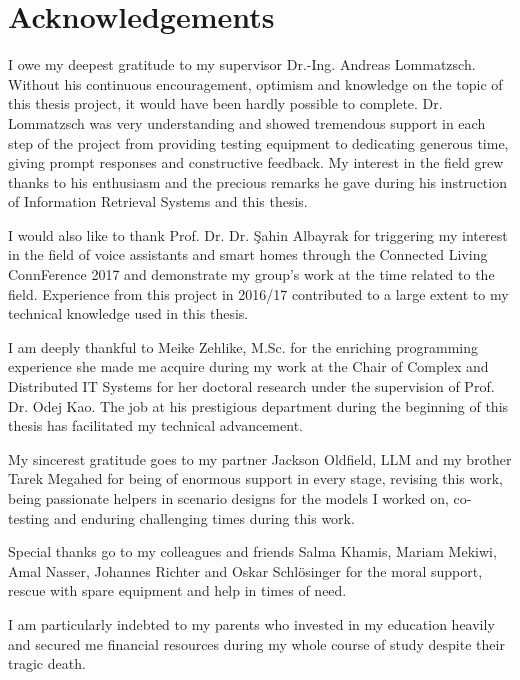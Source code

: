 
\newpage
{}
\chapter*{Acknowledgements}

I owe my deepest gratitude to my supervisor Dr.-Ing. Andreas Lommatzsch. Without his continuous encouragement, optimism and knowledge on the topic of this thesis project, it would  have been hardly possible to complete.%
Dr. Lommatzsch was very understanding and showed tremendous support in each step of the project from providing testing equipment to dedicating generous time, giving prompt responses and constructive feedback. My interest in the field grew thanks to his enthusiasm and the precious remarks he gave during his instruction of Information Retrieval Systems and this thesis.

I would also like to thank Prof. Dr. Dr. \c{S}ahin Albayrak for triggering my interest in the field of voice assistants and smart homes %
through the Connected Living ConnFerence 2017 and demonstrate my group’s work at the time related to the field. Experience from this project in 2016/17 contributed to a large extent to my technical knowledge used in this thesis.

I am deeply thankful to Meike Zehlike, M.Sc. for the enriching programming experience she made me acquire during my work at the Chair of Complex and Distributed IT Systems for her doctoral research under the supervision of Prof. Dr. Odej Kao. The job at his prestigious department during the beginning of this thesis has facilitated my technical advancement.

My sincerest gratitude goes to my partner Jackson Oldfield, LLM and my brother Tarek Megahed for being of enormous support in every stage, revising this work, being passionate helpers in scenario designs for the models I worked on, co-testing and enduring challenging times during this work.

Special thanks go to my colleagues and friends Salma Khamis, Mariam Mekiwi, Amal Nasser, Johannes Richter and Oskar Schlösinger for the moral support, rescue with spare equipment and help in times of need.

I am particularly indebted to my parents who invested in my education heavily and secured me financial resources during my whole course of study despite their tragic death.


